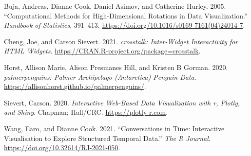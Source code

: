 \hypertarget{refs}{}
\begin{CSLReferences}{1}{0}
\leavevmode{}%
Buja, Andreas, Dianne Cook, Daniel Asimov, and Catherine Hurley. 2005. {``Computational Methods for High-Dimensional Rotations in Data Visualization.''} \emph{Handbook of Statistics}, 391--413. \url{https://doi.org/10.1016/s0169-7161(04)24014-7}.

\leavevmode{}%
Cheng, Joe, and Carson Sievert. 2021. \emph{{crosstalk}: Inter-Widget Interactivity for HTML Widgets}. \url{https://CRAN.R-project.org/package=crosstalk}.

\leavevmode{}%
Horst, Allison Marie, Alison Presmanes Hill, and Kristen B Gorman. 2020. \emph{{palmerpenguins}: Palmer Archipelago (Antarctica) Penguin Data}. \url{https://allisonhorst.github.io/palmerpenguins/}.

\leavevmode{}%
Sievert, Carson. 2020. \emph{{Interactive Web-Based Data Visualizatio}n with r, Plotly, and Shiny}. Chapman; Hall/CRC. \url{https://plotly-r.com}.

\leavevmode{}%
Wang, Earo, and Dianne Cook. 2021. {``Conversations in Time: Interactive Visualisation to Explore Structured Temporal Data.''} \emph{The R Journal}. \url{https://doi.org/10.32614/RJ-2021-050}.

\end{CSLReferences}



\address{%
Zoljargal Batsaikhan\\
Monash University\\%
Department of Letter Q\\ Somewhere, Australia\\
%
\url{https://www.britannica.com/animal/quokka}\\%
\textit{ORCiD: \href{https://orcid.org/N/A}{N/A}}\\%
\href{mailto:zoljargal11@gmail.com}{\nolinkurl{zoljargal11@gmail.com}}%
}

\address{%
Dianne Cook\\
Monash University\\%
Department of Letter B\\ Somewhere, Australia\\
%
\url{https://www.britannica.com/animal/bilby}\\%
\textit{ORCiD: \href{https://orcid.org/0000-0002-3813-7155}{0000-0002-3813-7155}}\\%
\href{mailto:dicook@monash.edu}{\nolinkurl{dicook@monash.edu}}%
}

\address{%
Ursula Laa\\
BOKU University\\%
Department of Letter B\\ Somewhere, Australia\\
%
\url{https://www.britannica.com/animal/bilby}\\%
\textit{ORCiD: \href{https://orcid.org/0000-0002-0249-6439}{0000-0002-0249-6439}}\\%
\href{mailto:ursula.laa@boku.ac.at}{\nolinkurl{ursula.laa@boku.ac.at}}%
}
